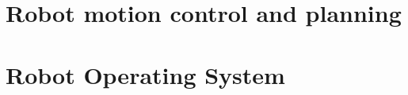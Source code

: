 \documentclass[12pt, a4paper]{report}
\begin{document}
    \chapter{Robot motion control and planning}
    
    
    
    
    

    \chapter{Robot Operating System}
    
    
    
\end{document}
